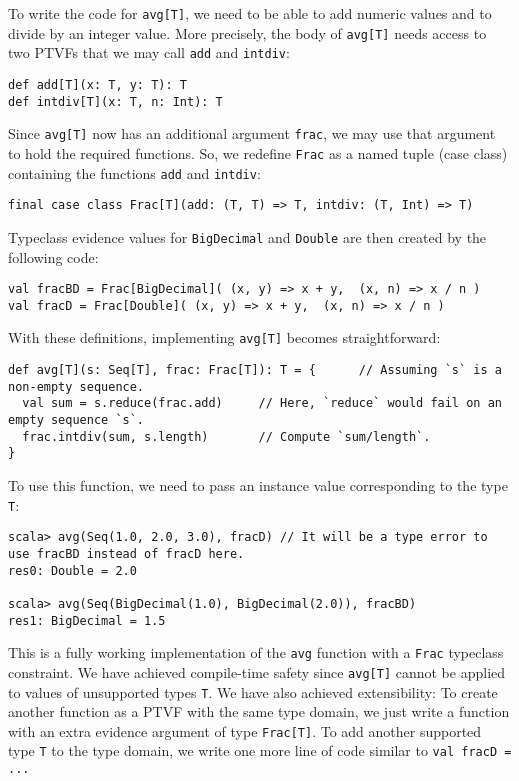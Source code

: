 To write the code for \lstinline!avg[T]!, we need to be able to add
numeric values and to divide by an integer value. More precisely,
the body of \lstinline!avg[T]! needs access to two PTVFs that we
may call \lstinline!add! and \lstinline!intdiv!:
\begin{lstlisting}
def add[T](x: T, y: T): T
def intdiv[T](x: T, n: Int): T
\end{lstlisting}
Since \lstinline!avg[T]! now has an additional argument \lstinline!frac!,
we may use that argument to hold the required functions. So, we redefine
\lstinline!Frac! as a named tuple (case class) containing the functions
\lstinline!add! and \lstinline!intdiv!:
\begin{lstlisting}
final case class Frac[T](add: (T, T) => T, intdiv: (T, Int) => T)
\end{lstlisting}
Typeclass evidence values for \lstinline!BigDecimal! and \lstinline!Double!
are then created by the following code:
\begin{lstlisting}
val fracBD = Frac[BigDecimal]( (x, y) => x + y,  (x, n) => x / n )
val fracD = Frac[Double]( (x, y) => x + y,  (x, n) => x / n )
\end{lstlisting}
With these definitions, implementing \lstinline!avg[T]! becomes straightforward:
\begin{lstlisting}
def avg[T](s: Seq[T], frac: Frac[T]): T = {      // Assuming `s` is a non-empty sequence.
  val sum = s.reduce(frac.add)     // Here, `reduce` would fail on an empty sequence `s`.
  frac.intdiv(sum, s.length)       // Compute `sum/length`.
}
\end{lstlisting}
To use this function, we need to pass an instance value corresponding
to the type \lstinline!T!:
\begin{lstlisting}
scala> avg(Seq(1.0, 2.0, 3.0), fracD) // It will be a type error to use fracBD instead of fracD here.
res0: Double = 2.0

scala> avg(Seq(BigDecimal(1.0), BigDecimal(2.0)), fracBD)
res1: BigDecimal = 1.5
\end{lstlisting}

This is a fully working implementation of the \lstinline!avg! function
with a \lstinline!Frac! typeclass constraint. We have achieved compile-time
safety since \lstinline!avg[T]! cannot be applied to values of unsupported
types \lstinline!T!. We have also achieved extensibility: To create
another function as a PTVF with the same type domain, we just write
a function with an extra evidence argument of type \lstinline!Frac[T]!.
To add another supported type \lstinline!T! to the type domain, we
write one more line of code similar to \lstinline!val fracD = ...!

